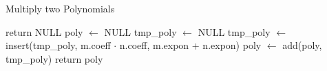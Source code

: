 \begin{algorithm}[H]
    \caption{Multiply two Polynomials} \label{multiply}
    \begin{algorithmic}
        \State return NULL
    \EndIf
    \State poly $\gets$ NULL
        \State tmp\_poly $\gets$ NULL
            \State tmp\_poly $\gets$ insert(tmp\_poly, m.coeff $\cdot$ n.coeff, m.expon + n.expon)
        \EndFor
        \State poly $\gets$ add(poly, tmp\_poly)
    \EndFor
    \State return poly
    \EndProcedure
\end{algorithmic}

\end{algorithm}